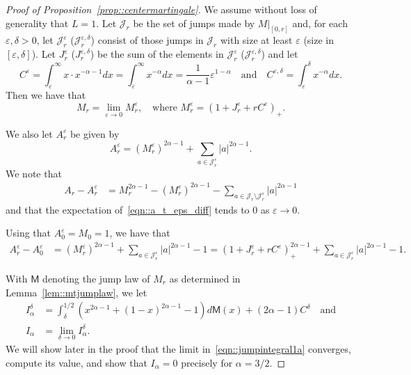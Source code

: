 \documentclass[JEP,XML,SOM,Unicode]{cedram}
\let\mathcal\mathscr
\let\epsilon\varepsilon
\theoremstyle{plain}
\numberwithin{theorem}{section}
\theoremstyle{definition}
\newcommand{\CJ}{{\mathcal J}}
\begin{document}
\begin{proof}[Proof of Proposition~\ref{prop::centermartingale}]
We assume without loss of generality that $L = 1$. Let $\CJ_r$ be the set of jumps made by $M|_{[0,r]}$ and, for each $\epsilon,\delta > 0$, let $\CJ_r^\epsilon$ (\resp $\CJ_r^{\epsilon,\delta}$) consist of those jumps in $\CJ_r$ with size at least $\epsilon$ (\resp size in $[\epsilon,\delta]$). Let $J_r^\epsilon$ (\resp $J_r^{\epsilon,\delta}$) be the sum of the elements in $\CJ_r^\epsilon$ (\resp $\CJ_r^{\epsilon,\delta}$) and let
\[
C^\epsilon = \int_\epsilon^\infty x \cdot x^{-\alpha - 1} dx = \int_\epsilon^\infty x^{-\alpha} dx = \frac{1}{\alpha-1} \epsilon^{1-\alpha} \quad\text{and}\quad C^{\epsilon,\delta} = \int_\epsilon^\delta x^{-\alpha} dx.
\]
Then we have that
\[
M_r = \lim_{\epsilon \to 0} M_r^\epsilon, \quad\text{where } M_r^\epsilon = (1 + J_r^\epsilon + r C^\epsilon)_+.
\]

We also let $A_r^\epsilon$ be given by
\[
A_r^\epsilon = (M_r^\epsilon)^{2\alpha-1} + \sum_{a \in \CJ_r^\epsilon} |a|^{2\alpha-1}.
\]
We note that
\begin{align}
\label{eqn::a_t_eps_diff}
A_r - A_r^\epsilon
&= M_r^{2\alpha-1} - (M_r^\epsilon)^{2\alpha-1} - \sum_{a \in \CJ_r \setminus \CJ_r^\epsilon} |a|^{2\alpha-1}
\end{align}
and that the expectation of~\eqref{eqn::a_t_eps_diff} tends to $0$ as $\epsilon \to 0$.

Using that $A_0^\epsilon = M_0 = 1$, we have that
\begin{align*}
A_r^\epsilon - A_0^\epsilon
&= (M_r^\epsilon)^{2\alpha-1} + \sum_{a \in \CJ_r^\epsilon} |a|^{2\alpha-1} - 1
= \left( 1+J_r^\epsilon + r C^\epsilon \right)_+^{2\alpha-1} + \sum_{a \in \CJ_r^\epsilon} |a|^{2\alpha-1} - 1.
\end{align*}

\newcommand{\jumplaw}{\mathsf{M}}

With $\jumplaw$ denoting the jump law of $M_r$ as determined in Lemma~\ref{lem::mtjumplaw}, we let
\begin{align}
I_\alpha^\delta &= \int_\delta^{1/2} \left( x^{2\alpha - 1} + (1-x)^{2\alpha -1} - 1 \right) d\jumplaw(x) + (2\alpha - 1)C^\delta \quad\text{and} \label{eqn::jumpintegral1}\\
I_\alpha &= \lim_{\delta \to 0} I_\alpha^\delta. \label{eqn::jumpintegral1a}
\end{align}
We will show later in the proof that the limit in~\eqref{eqn::jumpintegral1a} converges, compute its value, and show that $I_\alpha = 0$ precisely for $\alpha=3/2$.


\end{proof}
\end{document}

